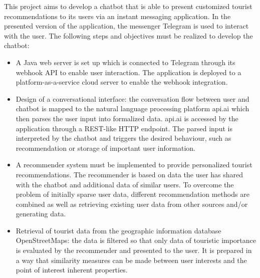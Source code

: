 
This project aims to develop a chatbot that is able to present customized tourist recommendations to its users via an instant messaging application. In the presented version of the application, the messenger Telegram is used to interact with the user. 
The following steps and objectives must be realized to develop the chatbot:
\begin{itemize}
\item A Java web server is set up which is connected to Telegram through its webhook API to enable user interaction. The application is deployed to a platform-as-a-service cloud server to enable the webhook integration.
 
\item Design of a conversational interface: the conversation flow between user and chatbot is mapped to the natural language processing platform api.ai which then parses the user input into formalized data. api.ai is accessed by the application through a REST-like HTTP endpoint. The parsed input is interpreted by the chatbot and triggers the desired behaviour, such as recommendation or storage of important user information.

\item A recommender system must be implemented to provide personalized tourist recommendations. The recommender is based on data the user has shared with the chatbot and additional data of similar users. To overcome the problem of initially sparse user data, different recommendation methods are combined as well as retrieving existing user data from other sources and/or generating data.

\item Retrieval of tourist data from the geographic information database OpenStreetMaps: the data is filtered so that only data of touristic importance is evaluated by the recommender and presented to the user. It is prepared in a way that similarity measures can be made between user interests and the point of interest inherent properties.
\end{itemize}
